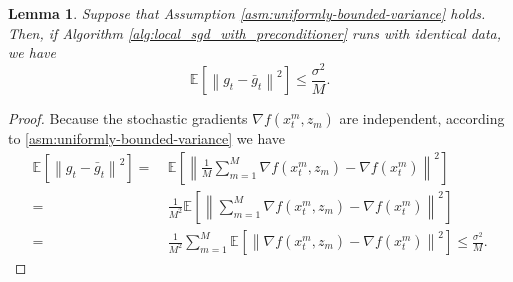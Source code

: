 \documentclass[sn-mathphys,Numbered]{sn-jnl}%
\newtheorem{lemma}{Lemma}%
\renewcommand{\|}{\parallel}
\newcommand\ec[2][]{\ensuremath{\mathbb{E}_{#1} \left[#2\right]}}
\newcommand\ecn[3][]{\ec[#1]{\norm{#2}^2_{#3}}}
\newcommand{\norm}[1]{\left\lVert#1\right\rVert}
\renewcommand {\*} {\ast}
\begin{document}
\begin{lemma}
     \label{lemma:minibatch-variance-reduction}
     Suppose that Assumption \ref{asm:uniformly-bounded-variance} holds. Then, if Algorithm \ref{alg:local_sgd_with_preconditioner} runs with identical data, we have
     \[ \ecn{g_t - \bar{g}_t}{} \leq \frac{\sigma^2}{M}. \]
\end{lemma}
\begin{proof}
     Because the stochastic gradients $\nabla f(x_t^m, z_m)$ are independent, according to \ref{asm:uniformly-bounded-variance} we have
     \begin{align*}
         \ecn{g_t - \bar{g}_t}{} =&\ \ecn{\frac{1}{M}\sum\limits_{m=1}^M \nabla f(x_t^m, z_m) - \nabla f(x_t^m)}{}
         \\
         =&\ \frac{1}{M^2} \ecn{ \sum_{m=1}^{M} \nabla f(x_t^m, z_m) - \nabla f(x_t^m) }{} \\ =&\ \frac{1}{M^2} \sum_{m=1}^{M} \ecn{\nabla f(x_t^m, z_m) - \nabla f(x_t^m)}{} \leq \frac{\sigma^2}{M}.
     \end{align*}
\end{proof}
\end{document}
